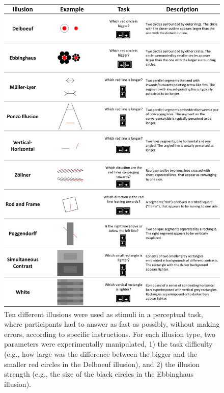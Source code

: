 \documentclass[
  man,floatsintext]{apa6}
\begin{document}
\begin{figure}
\includegraphics[width=1\linewidth]{../../figures/Figure2} \caption{Ten different illusions were used as stimuli in a perceptual task, where participants had to answer as fast as possibly, without making errors, according to specific instructions. For each illusion type, two parameters were experimentally manipulated, 1) the task difficulty (e.g., how large was the difference between the bigger and the smaller red circles in the Delboeuf illusion), and 2) the illusion strength (e.g., the size of the black circles in the Ebbinghaus illusion).}\label{fig:unnamed-chunk-3}
\end{figure}
\end{document}
